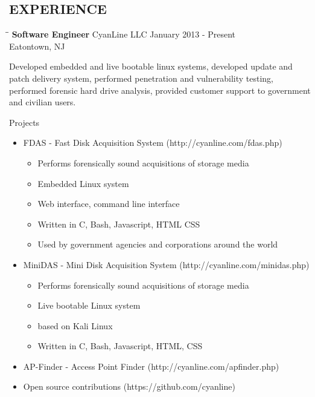 \documentclass{res}
\begin{document}
\begin{resume}
\section{EXPERIENCE}
   \vspace{-0.1in}	
   \begin{tabbing}
   \hspace{2.3in}\= \hspace{2.6in}\= \kill %
    {\bf Software Engineer} \>CyanLine LLC     \>January 2013 - Present\\
                             \>Eatontown, NJ
   \end{tabbing}\vspace{-20pt}      %
    Developed embedded and live bootable linux systems, 
    developed update and patch delivery system,
    performed penetration and vulnerability testing,
    performed forensic hard drive analysis,
    provided customer support to government and civilian users.

    Projects
    \begin{itemize}
        \item FDAS - Fast Disk Acquisition System (http://cyanline.com/fdas.php)
        \begin{itemize}
            \item Performs forensically sound acquisitions of storage media
            \item Embedded Linux system
            \item Web interface, command line interface
            \item Written in C, Bash, Javascript, HTML CSS
            \item Used by government agencies and corporations around the world
        \end{itemize}
        \item MiniDAS - Mini Disk Acquisition System (http://cyanline.com/minidas.php)
        \begin{itemize}
            \item Performs forensically sound acquisitions of storage media
            \item Live bootable Linux system
            \item based on Kali Linux
            \item Written in C, Bash, Javascript, HTML, CSS
        \end{itemize}
        \item AP-Finder - Access Point Finder (http://cyanline.com/apfinder.php)
        \item Open source contributions (https://github.com/cyanline)
    \end{itemize}


\end{resume}
\end{document}

